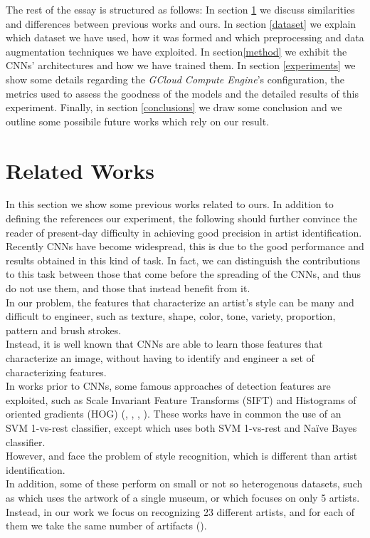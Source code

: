 \documentclass{article}
\begin{document}
The rest of the essay is structured as follows: In section \ref{relwor} we discuss  similarities and differences between previous works and ours. In section \ref{dataset} we explain which dataset we have used, how it was formed and which preprocessing and data augmentation techniques we have exploited. In section\ref{method} we exhibit the CNNs' architectures and how we have trained them. In section \ref{experiments} we show some details regarding the \textit{GCloud Compute Engine}'s configuration, the metrics used to assess the goodness of the models and the detailed results of this experiment. Finally, in section \ref{conclusions} we draw some conclusion and we outline some possibile future works which rely on our result.


\section{Related Works}\label{relwor}

In this section we show some previous works related to ours. In addition to defining the references our experiment, the following should further convince the reader of present-day difficulty in achieving good precision in artist identification.\\
Recently CNNs have become widespread, this is due to the good performance and results obtained in this kind of task. In fact, we can distinguish the contributions to this task between those that come before the spreading of the CNNs, and thus do not use them, and those that instead benefit from it.\\
In our problem, the features that characterize an artist's style can be many and difficult to engineer, such as texture, shape, color, tone, variety, proportion, pattern and brush strokes.\\
Instead, it is well known that CNNs are able to learn those features that characterize an image, without having to identify and engineer a set of characterizing features.\\
In works prior to CNNs, some famous approaches of detection features are exploited, such as Scale Invariant Feature Transforms (SIFT) and Histograms of oriented gradients (HOG) (\cite{Saleh2015}, \cite{mensink2014}, \cite{lombardi05}, \cite{jou2011}). These works have in common the use of an SVM 1-vs-rest classifier, except \cite{jou2011} which uses both SVM 1-vs-rest and Naïve Bayes classifier.\\ However, \cite{lombardi05} and \cite{jou2011} face the problem of style recognition, which is different than artist identification.\\
In addition, some of these perform on small or not so heterogenous datasets, such as \cite{mensink2014} which uses the artwork of a single museum, or \cite{jou2011} which focuses on only 5 artists. Instead, in our work we focus on recognizing 23 different artists, and for each of them we take the same number of artifacts (\cite{ArtGANDataset}). \\
\end{document}
